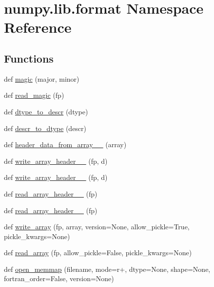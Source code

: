 \hypertarget{namespacenumpy_1_1lib_1_1format}{}\section{numpy.\+lib.\+format Namespace Reference}
\label{namespacenumpy_1_1lib_1_1format}
\subsection*{Functions}
\begin{DoxyCompactItemize}
\item 
def \hyperlink{namespacenumpy_1_1lib_1_1format_af833693b9ca599e9e0e3186a817a131b}{magic} (major, minor)
\item 
def \hyperlink{namespacenumpy_1_1lib_1_1format_a0c0e8d8c23093f508fffdd5b6cba4d3c}{read\+\_\+magic} (fp)
\item 
def \hyperlink{namespacenumpy_1_1lib_1_1format_ae62e215cf66dfa14897e2cbb3e399599}{dtype\+\_\+to\+\_\+descr} (dtype)
\item 
def \hyperlink{namespacenumpy_1_1lib_1_1format_a8ef944b60e69a059642419df5bc12fb0}{descr\+\_\+to\+\_\+dtype} (descr)
\item 
def \hyperlink{namespacenumpy_1_1lib_1_1format_af34f49d13b4598e1dea0cdad339ff01a}{header\+\_\+data\+\_\+from\+\_\+array\+\_\+\_} (array)
\item 
def \hyperlink{namespacenumpy_1_1lib_1_1format_a748ba757811ac4173ff949c21a457b12}{write\+\_\+array\+\_\+header\+\_\+\_} (fp, d)
\item 
def \hyperlink{namespacenumpy_1_1lib_1_1format_a8d77dd28d804615fb8be21b34f3f9381}{write\+\_\+array\+\_\+header\+\_\+\_} (fp, d)
\item 
def \hyperlink{namespacenumpy_1_1lib_1_1format_a96e510ed462ceebe504bf08d8fbf400b}{read\+\_\+array\+\_\+header\+\_\+\_} (fp)
\item 
def \hyperlink{namespacenumpy_1_1lib_1_1format_a81839fc030545f78ce647bbc77ffae20}{read\+\_\+array\+\_\+header\+\_\+\_} (fp)
\item 
def \hyperlink{namespacenumpy_1_1lib_1_1format_a3601f00958d232eb85e69c568a5171fe}{write\+\_\+array} (fp, array, version=None, allow\+\_\+pickle=True, pickle\+\_\+kwargs=None)
\item 
def \hyperlink{namespacenumpy_1_1lib_1_1format_ad0c61d5ab87819a60263307a3e9623d7}{read\+\_\+array} (fp, allow\+\_\+pickle=False, pickle\+\_\+kwargs=None)
\item 
def \hyperlink{namespacenumpy_1_1lib_1_1format_a8f8b17821ffe903261f3b58cabd8f386}{open\+\_\+memmap} (filename, mode=\textquotesingle{}r+\textquotesingle{}, dtype=None, shape=None, fortran\+\_\+order=False, version=None)
\end{DoxyCompactItemize}

